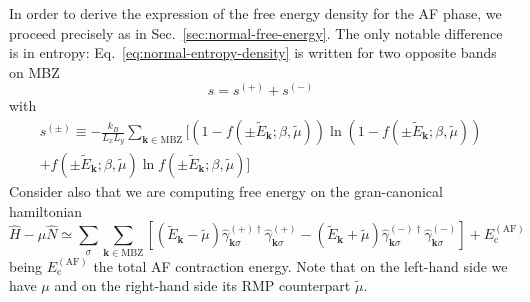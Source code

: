 In order to derive the expression of the free energy density for the AF phase, we proceed precisely as in Sec.~\ref{sec:normal-free-energy}. The only notable difference is in entropy: Eq.~\eqref{eq:normal-entropy-density} is written for two opposite bands on MBZ
\[
	s = s^{(+)} + s^{(-)}
\]
with
\begin{multline}
	s^{(\pm)} \equiv -\frac{k_B}{L_x L_y} \sum_{\mathbf{k}\in\mathrm{MBZ}} \Big[
		\left(
		1- f( \pm\tilde{E}_\mathbf{k}; \beta,\tilde{\mu})
		\right) \ln \left(
		1- f( \pm\tilde{E}_\mathbf{k}; \beta,\tilde{\mu})
		\right) \\
		+ f(
		\pm\tilde{E}_\mathbf{k}; \beta,\tilde{\mu})
		\ln f( \pm\tilde{E}_\mathbf{k}; \beta,\tilde{\mu})
	\Big]
\end{multline}
Consider also that we are computing free energy on the gran-canonical hamiltonian
\[
	\hat H - \mu \hat N \simeq \sum_\sigma \sum_{\mathbf{k}\in\mathrm{MBZ}} \left[
		(\tilde{E}_\mathbf{k} - \tilde{\mu}) \hat \gamma_{\mathbf{k}\sigma}^{(+)\dagger} \hat \gamma_{\mathbf{k}\sigma}^{(+)} - (\tilde{E}_\mathbf{k} + \tilde{\mu}) \hat \gamma_{\mathbf{k}\sigma}^{(-)\dagger} \hat \gamma_{\mathbf{k}\sigma}^{(-)}
	\right] + E_\mathrm{c}^{(\mathrm{AF})}
\]
being $E_\mathrm{c}^{(\mathrm{AF})}$ the total AF contraction energy. Note that on the left-hand side we have $\mu$ and on the right-hand side its RMP counterpart $\tilde{\mu}$.

